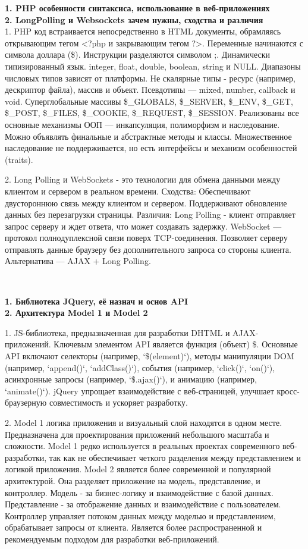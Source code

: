 \documentclass{article}
\begin{document}
\hfill
\begin{minipage}{.3\textwidth}
    \textbf{1. PHP особенности синтаксиса, использование в веб-приложениях}\\
    \textbf{2. LongPolling и Websockets зачем нужны, сходства и различия}\\
1. PHP код встраивается непосредственно в HTML документы, обрамляясь открывающим тегом <?php и закрывающим тегом ?>. Переменные начинаются с символа доллара (\$). Инструкции разделяются символом ;.
Динамически типизированный язык. integer, float, double, boolean, string и NULL. Диапазоны числовых типов зависят от платформы. Не скалярные типы - ресурс (например, дескриптор файла), массив и объект.
Псевдотипы — mixed, number, callback и void. Суперглобальные массивы \$\_GLOBALS, \$\_SERVER, \$\_ENV, \$\_GET, \$\_POST, \$\_FILES, \$\_COOKIE, \$\_REQUEST, \$\_SESSION. Реализованы все основные механизмы ООП — инкапсуляция, полиморфизм и наследование. Можно объявлять финальные и абстрактные методы и классы.
Множественное наследование не поддерживается, но есть интерфейсы и механизм особенностей (traits).

2. Long Polling и WebSockets - это технологии для обмена данными между клиентом и сервером в реальном времени. Сходства: Обеспечивают двустороннюю связь между клиентом и сервером.
Поддерживают обновление данных без перезагрузки страницы. Различия: Long Polling - клиент отправляет запрос серверу и ждет ответа, что может создавать задержку. WebSocket — протокол полнодуплексной связи поверх TCP-соединения.
Позволяет серверу отправлять данные браузеру без дополнительного запроса со стороны клиента. Альтернатива — AJAX + Long Polling.
\end{minipage}
\\ 
\begin{minipage}{.3\textwidth}
    \textbf{1. Библиотека JQuery, её назнач и основ API}\\
    \textbf{2. Архитектура Model 1 и Model 2}

1. JS-библиотека, предназначенная для разработки DHTML и AJAX-приложений. Ключевым элементом API является функция (объект) \$. Основные API включают селекторы (например, `\$(element)`), методы манипуляции DOM (например, `append()`, `addClass()`), события (например, `click()`, `on()`), асинхронные запросы (например, `\$.ajax()`), и анимацию (например, `animate()`). jQuery упрощает взаимодействие с веб-страницей, улучшает кросс-браузерную совместимость и ускоряет разработку.

2. Model 1 логика приложения и визуальный слой находятся в одном месте. Предназначена для проектирования приложений небольшого масштаба и сложности.
Model 1 редко используется в реальных проектах современного веб-разработки, так как не обеспечивает четкого разделения между представлением и логикой приложения.
Model 2 является более современной и популярной архитектурой. Она разделяет приложение на модель, представление, и контроллер. Модель - за бизнес-логику и взаимодействие с базой данных.
Представление - за отображение данных и взаимодействие с пользователем. Контроллер управляет потоком данных между моделью и представлением, обрабатывает запросы от клиента.
Является более распространенной и рекомендуемым подходом для разработки веб-приложений.
\end{minipage}
\end{document}
